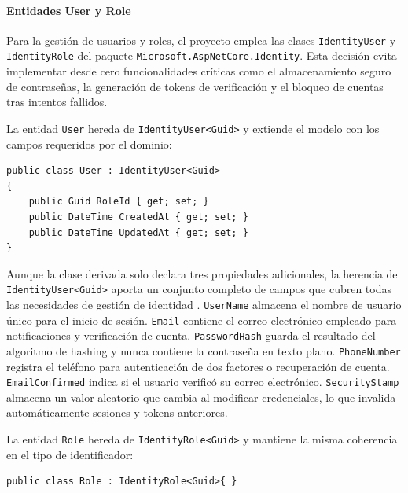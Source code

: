 \paragraph{Entidades User y Role}

Para la gestión de usuarios y roles, el proyecto emplea las clases \texttt{IdentityUser} y \texttt{IdentityRole} del paquete \texttt{Microsoft.AspNetCore.Identity}. Esta decisión evita implementar desde cero funcionalidades críticas como el almacenamiento seguro de contraseñas, la generación de tokens de verificación y el bloqueo de cuentas tras intentos fallidos.

La entidad \texttt{User} hereda de \texttt{IdentityUser<Guid>} y extiende el modelo con los campos requeridos por el dominio:

\begin{lstlisting}[language={[Sharp]C}, caption={Entidad User que hereda de IdentityUser<Guid>}, label={lst:user}]
public class User : IdentityUser<Guid>
{
    public Guid RoleId { get; set; }
    public DateTime CreatedAt { get; set; }
    public DateTime UpdatedAt { get; set; }
}
\end{lstlisting}

Aunque la clase derivada solo declara tres propiedades adicionales, la herencia de \texttt{IdentityUser<Guid>} aporta un conjunto completo de campos que cubren todas las necesidades de gestión de identidad \cite{microsoft_identity_model}. 
\texttt{UserName} almacena el nombre de usuario único para el inicio de sesión. 
\texttt{Email} contiene el correo electrónico empleado para notificaciones y verificación de cuenta. 
\texttt{PasswordHash} guarda el resultado del algoritmo de hashing y nunca contiene la contraseña en texto plano. 
\texttt{PhoneNumber} registra el teléfono para autenticación de dos factores o recuperación de cuenta. 
\texttt{EmailConfirmed} indica si el usuario verificó su correo electrónico. 
\texttt{SecurityStamp} almacena un valor aleatorio que cambia al modificar credenciales, lo que invalida automáticamente sesiones y tokens anteriores.

La entidad \texttt{Role} hereda de \texttt{IdentityRole<Guid>} y mantiene la misma coherencia en el tipo de identificador:

\begin{lstlisting}[language={[Sharp]C}, caption={Entidad Role que hereda de IdentityRole<Guid>}, label={lst:role}]
public class Role : IdentityRole<Guid>{ }
\end{lstlisting}

